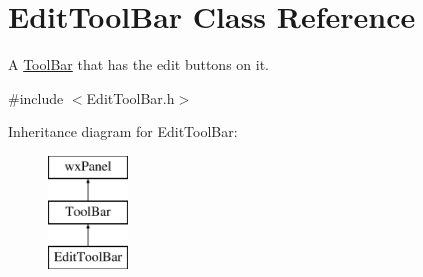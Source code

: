 \hypertarget{class_edit_tool_bar}{}\section{Edit\+Tool\+Bar Class Reference}
\label{class_edit_tool_bar}


A \hyperlink{class_tool_bar}{Tool\+Bar} that has the edit buttons on it.  




{\ttfamily \#include $<$Edit\+Tool\+Bar.\+h$>$}

Inheritance diagram for Edit\+Tool\+Bar\+:\begin{figure}[H]
\begin{center}
\leavevmode
\includegraphics[height=3.000000cm]{class_edit_tool_bar}
\end{center}
\end{figure}
